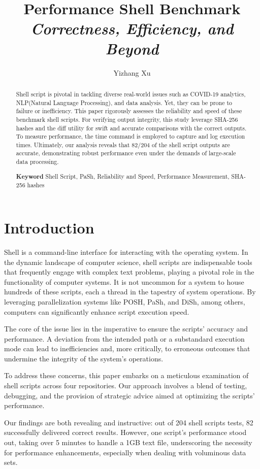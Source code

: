 \documentclass[sigplan, screen, 10pt]{acmart}
\title{Performance Shell Benchmark \newline
\emph{Correctness, Efficiency, and Beyond}}
\author{Yizhang Xu}
\affiliation{BUPT}
\begin{document}
\begin{abstract}
Shell script\cite{johnson2006shell} is pivotal in tackling diverse real-world issues such as COVID-19 analytics\cite{agbehadji2020review}, NLP(Natural Language Processing)\cite{ofer2021language}, and data analysis. 
Yet, they can be prone to failure or inefficiency.
This paper rigorously assesses the reliability and speed of these benchmark shell scripts.
For verifying output integrity, this study leverage SHA-256 hashes\cite{manankova2022cryptanalysis} and the diff utility\cite{blum2008linux} for swift and accurate comparisons with the correct outputs.
To measure performance, the time command is employed to capture and log execution times.
Ultimately, our analysis reveals that 82/204 of the shell script outputs are accurate, demonstrating robust performance even under the demands of large-scale data processing.

\textbf{Keyword} Shell Script, PaSh, Reliability and Speed, Performance Measurement, SHA-256 hashes
\end{abstract}

\maketitle

\section{Introduction}
\label{intro}
Shell is a command-line interface for interacting with the operating system\cite{newham2005learning}.
In the dynamic landscape of computer science, shell scripts are indispensable tools that frequently engage with complex text problems, playing a pivotal role in the functionality of computer systems\cite{naik2018learning}.
It is not uncommon for a system to house hundreds of these scripts, each a thread in the tapestry of system operations\cite{leite2014deploying}\cite{goforth2013role}.
By leveraging parallelization systems like POSH\cite{raghavan2020posh}, PaSh\cite{vasilakis2021pash}, and DiSh\cite{mustafa2023dish}, among others, computers can significantly enhance script execution speed.\par
The core of the issue lies in the imperative to ensure the scripts' accuracy and performance. 
A deviation from the intended path or a substandard execution mode can lead to inefficiencies and, more critically, to erroneous outcomes that undermine the integrity of the system's operations\cite{goforth2013role}.\par
To address these concerns, this paper embarks on a meticulous examination of shell scripts across four repositories. 
Our approach involves a blend of testing, debugging, and the provision of strategic advice aimed at optimizing the scripts' performance.\par
Our findings are both revealing and instructive: out of 204 shell scripts tests, 82 successfully delivered correct results. 
However, one script's performance stood out, taking over 5 minutes to handle a 1GB text file, underscoring the necessity for performance enhancements, especially when dealing with voluminous data sets.
\end{document}
